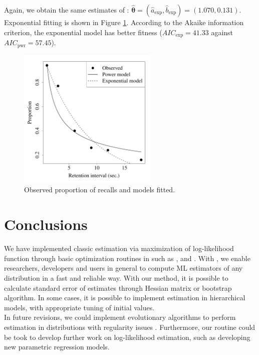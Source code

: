 \documentclass[nojss]{jss}
\begin{document}
Again, we obtain the same estimates of \cite{Myung2003}: $\hat{\boldsymbol{\theta}}=(\hat{a}_{\text{exp}},\hat{b}_{\text{exp}})=(1.070,0.131)$. Exponential fitting is shown in Figure \ref{fig:forgetting}. According to the Akaike information criterion, the exponential model has better fitness ($AIC_{\text{exp}}=41.33$ against $AIC_{\text{pwr}}=57.45$).


\begin{figure}[H]
\centering
  \includegraphics[width=0.6\textwidth]{article-RetentionPlot}
  \caption{\label{fig:forgetting} Observed proportion of recalls and models fitted.}
\end{figure}


\section{Conclusions} \label{sec:conclussions}

We have implemented classic estimation via maximization of log-likelihood function through basic optimization routines in  such as ,  and . With , we enable researchers, developers and users in general to compute ML estimators of any distribution in a fast and reliable way. With our  method, it is possible to calculate standard error of estimates through Hessian matrix or bootstrap algorithm. In some cases, it is possible to implement estimation in hierarchical models, with appropriate tuning of initial values. \\

In future revisions, we could implement evolutionary algorithms to perform estimation in distributions with regularity issues \citep{Haupt2003}. Furthermore, our routine could be took to develop further work on log-likelihood estimation, such as developing new parametric regression models.



\end{document}
